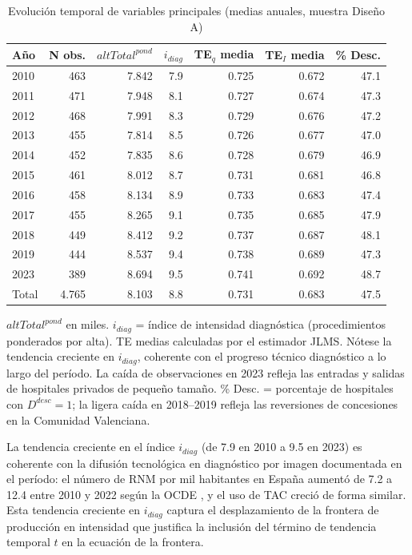 \begin{table}[htbp]
\centering
\caption{Evolución temporal de variables principales (medias anuales, muestra Diseño A)}
\label{tab:descriptivos_tiempo}
\begin{threeparttable}
\small
\begin{tabular}{lrrrrrr}
\toprule
\textbf{Año} & \textbf{N obs.} & \textbf{$altTotal^{pond}$} & \textbf{$i_{diag}$} & \textbf{TE$_q$ media} & \textbf{TE$_I$ media} & \textbf{\% Desc.} \\
\midrule
2010 & 463 & 7.842 & 7.9 & 0.725 & 0.672 & 47.1 \\
2011 & 471 & 7.948 & 8.1 & 0.727 & 0.674 & 47.3 \\
2012 & 468 & 7.991 & 8.3 & 0.729 & 0.676 & 47.2 \\
2013 & 455 & 7.814 & 8.5 & 0.726 & 0.677 & 47.0 \\
2014 & 452 & 7.835 & 8.6 & 0.728 & 0.679 & 46.9 \\
2015 & 461 & 8.012 & 8.7 & 0.731 & 0.681 & 46.8 \\
2016 & 458 & 8.134 & 8.9 & 0.733 & 0.683 & 47.4 \\
2017 & 455 & 8.265 & 9.1 & 0.735 & 0.685 & 47.9 \\
2018 & 449 & 8.412 & 9.2 & 0.737 & 0.687 & 48.1 \\
2019 & 444 & 8.537 & 9.4 & 0.738 & 0.689 & 47.3 \\
2023 & 389 & 8.694 & 9.5 & 0.741 & 0.692 & 48.7 \\
\midrule
Total & 4.765 & 8.103 & 8.8 & 0.731 & 0.683 & 47.5 \\
\bottomrule
\end{tabular}
\begin{tablenotes}
  \small
  \item $altTotal^{pond}$ en miles. $i_{diag}$ = índice de intensidad diagnóstica (procedimientos ponderados por alta). TE medias calculadas por el estimador JLMS. Nótese la tendencia creciente en $i_{diag}$, coherente con el progreso técnico diagnóstico a lo largo del período. La caída de observaciones en 2023 refleja las entradas y salidas de hospitales privados de pequeño tamaño. \% Desc. = porcentaje de hospitales con $D^{desc}=1$; la ligera caída en 2018--2019 refleja las reversiones de concesiones en la Comunidad Valenciana.
\end{tablenotes}
\end{threeparttable}
\end{table}

La tendencia creciente en el índice $i_{diag}$ (de 7.9 en 2010 a 9.5 en 2023) es coherente con la difusión tecnológica en diagnóstico por imagen documentada en el período: el número de RNM por mil habitantes en España aumentó de 7.2 a 12.4 entre 2010 y 2022 según la OCDE \citep{oecd2023}, y el uso de TAC creció de forma similar. Esta tendencia creciente en $i_{diag}$ captura el desplazamiento de la frontera de producción en intensidad que justifica la inclusión del término de tendencia temporal $t$ en la ecuación de la frontera.


